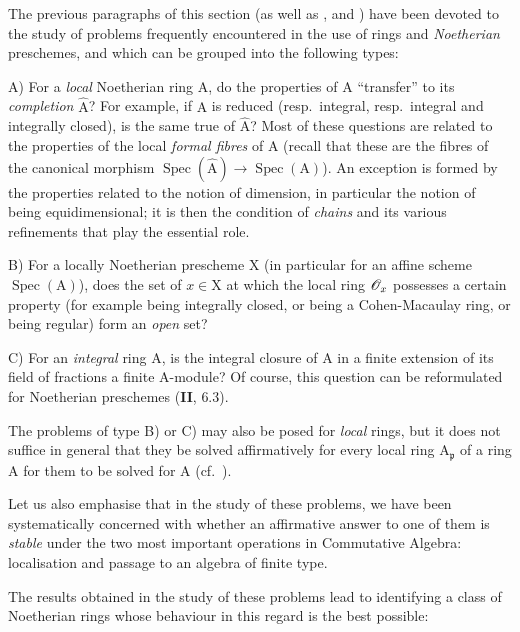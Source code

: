\begin{env}[7.8.1]
\label{IV.7.8.1}
The previous paragraphs of this section (as well as ,  and ) have been devoted to the study of problems frequently encountered in the use of rings and \emph{Noetherian} preschemes, and which can be grouped into the following types:


A) For a \emph{local} Noetherian ring $\mathrm{A}$, do the properties of $\mathrm{A}$ ``transfer'' to its \emph{completion} $\widehat{\mathrm{A}}$? For example, if $\mathrm{A}$ is reduced (resp.\ integral, resp.\ integral and integrally closed), is the same true of $\widehat{\mathrm{A}}$? Most of these questions are related to the properties of the local \emph{formal fibres} of $\mathrm{A}$ (recall that these are the fibres of the canonical morphism $\operatorname{Spec}(\widehat{\mathrm{A}})\to\operatorname{Spec}(\mathrm{A})$). An exception is formed by the properties related to the notion of dimension, in particular the notion of being equidimensional; it is then the condition of \emph{chains} and its various refinements that play the essential role.

B) For a locally Noetherian prescheme $\mathrm{X}$ (in particular for an affine scheme $\operatorname{Spec}(\mathrm{A})$), does the set of $x\in\mathrm{X}$ at which the local ring $\mathscr{O}_x$ possesses a certain property (for example being integrally closed, or being a Cohen-Macaulay ring, or being regular) form an \emph{open} set?

C) For an \emph{integral} ring $\mathrm{A}$, is the integral closure of $\mathrm{A}$ in a finite extension of its field of fractions a finite $\mathrm{A}$-module? Of course, this question can be reformulated for Noetherian preschemes (\textbf{II}, $6.3$).

The problems of type B) or C) may also be posed for \emph{local} rings, but it does not suffice in general that they be solved affirmatively for every local ring $\mathrm{A}_\mathfrak{p}$ of a ring $\mathrm{A}$ for them to be solved for $\mathrm{A}$ (cf.\ ).

Let us also emphasise that in the study of these problems, we have been systematically concerned with whether an affirmative answer to one of them is \emph{stable} under the two most important operations in Commutative Algebra: localisation and passage to an algebra of finite type.

The results obtained in the study of these problems lead to identifying a class of Noetherian rings whose behaviour in this regard is the best possible:
\end{env}

